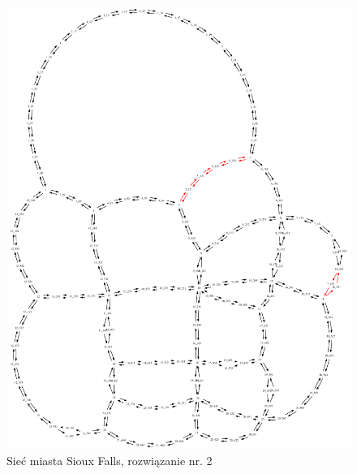 \documentclass[twoside,12pt]{report}
\begin{document}
\begin{figure}[ht]
\centering
\includegraphics[totalheight=0.580\textheight, angle=90]{img/sioux-out/2/network2}
\caption{Sieć miasta Sioux Falls, rozwiązanie nr. 2}
\label{sioux2}
\end{figure}
\end{document}
